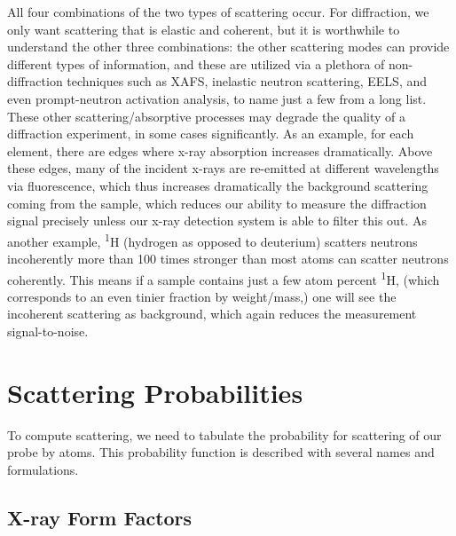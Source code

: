 All four combinations of the two types of scattering occur. For diffraction, we only want scattering that is elastic and coherent, but it is worthwhile to understand the other three combinations:  the other scattering modes can provide different types of information, and these are utilized via a plethora of non-diffraction techniques such as XAFS, inelastic neutron scattering, EELS, and even prompt-neutron activation analysis, to name just a few from a long list. These other scattering/absorptive processes may degrade the quality of a diffraction experiment, in some cases significantly. As an example, for each element, there are edges where x-ray absorption increases dramatically. Above these edges, many of the incident x-rays are re-emitted at different wavelengths via fluorescence, which thus increases dramatically the background scattering coming from the sample, which reduces our ability to measure the diffraction signal precisely unless our x-ray detection system is able to filter this out. As another example, \textsuperscript{1}H (hydrogen as opposed to deuterium) scatters neutrons incoherently more than 100 times stronger than most atoms can scatter neutrons coherently. This means if a sample contains just a few atom percent \textsuperscript{1}H, (which corresponds to an even tinier fraction by weight/mass,) one will see the incoherent scattering as background, which again reduces the measurement signal-to-noise. 

\section{Scattering Probabilities}

To compute scattering, we need to tabulate the probability for scattering of our probe by atoms. This probability function is described with several names and formulations.

\subsection{X-ray Form Factors}

